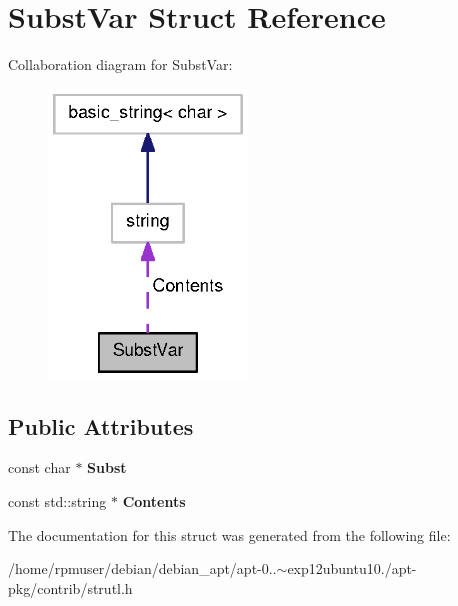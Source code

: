 \section{\-Subst\-Var \-Struct \-Reference}
\label{structSubstVar}


\-Collaboration diagram for \-Subst\-Var\-:
\nopagebreak
\begin{figure}[H]
\begin{center}
\leavevmode
\includegraphics[width=150pt]{structSubstVar__coll__graph}
\end{center}
\end{figure}
\subsection*{\-Public \-Attributes}
\begin{DoxyCompactItemize}
\item 
const char $\ast$ {\bfseries \-Subst}\label{structSubstVar_a40e724aee0fab212ead4d4cd0f48c48d}

\item 
const std\-::string $\ast$ {\bfseries \-Contents}\label{structSubstVar_a0f45045c029c8827abecb292b59e7698}

\end{DoxyCompactItemize}


\-The documentation for this struct was generated from the following file\-:\begin{DoxyCompactItemize}
\item 
/home/rpmuser/debian/debian\-\_\-apt/apt-\/0..$\sim$exp12ubuntu10./apt-\/pkg/contrib/strutl.\-h\end{DoxyCompactItemize}
